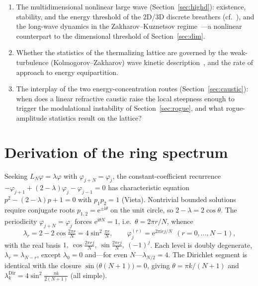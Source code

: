 \documentclass[11pt,reqno]{amsart}
\theoremstyle{plain}
\theoremstyle{definition}
\newcommand{\LN}{L_N}
\newcommand{\eu}{\mathrm{e}}
\begin{document}
\begin{enumerate}
$3.45$ in~\cite{JHR95}), so a proof can reach at most that crossover; stability along the whole breather
branch; and the \emph{fully} nonlinear regime---saturation and the rogue-wave focusing---where the admissible
coupling shrinks with the Diophantine alignment time.
\item The multidimensional nonlinear large wave (Section~\ref{sec:highd}): existence, stability, and
the energy threshold of the $2$D/$3$D discrete breathers (cf.~\cite{FKM97}), and the long-wave dynamics in the
Zakharov--Kuznetsov regime~\cite{ZakharovKuznetsov}---a nonlinear counterpart to the dimensional
threshold of Section~\ref{sec:dim}.
\item Whether the statistics of the thermalizing lattice are governed by the weak-turbulence
(Kolmogorov--Zakharov) wave kinetic description~\cite{ZakharovLvovFalkovich,DengHani}, and the rate of
approach to energy equipartition.
\item The interplay of the two energy-concentration routes (Section~\ref{sec:caustic}): when does a
linear refractive caustic raise the local steepness enough to trigger the modulational instability of
Section~\ref{sec:rogue}, and what rogue-amplitude statistics result on the lattice?
\end{enumerate}

\appendix

\section{Derivation of the ring spectrum}\label{app:spectrum}
Seeking $\LN\varphi=\lambda\varphi$ with $\varphi_{j+N}=\varphi_j$, the constant-coefficient recurrence
$-\varphi_{j+1}+(2-\lambda)\varphi_j-\varphi_{j-1}=0$ has characteristic equation
$p^2-(2-\lambda)p+1=0$ with $p_1p_2=1$ (Vieta). Nontrivial bounded solutions require conjugate roots
$p_{1,2}=\eu^{\pm\mathrm i\theta}$ on the unit circle, so $2-\lambda=2\cos\theta$. The periodicity
$\varphi_{j+N}=\varphi_j$ forces $\eu^{\mathrm i\theta N}=1$, i.e.\ $\theta=2\pi r/N$, whence
\[
  \lambda_r=2-2\cos\tfrac{2\pi r}{N}=4\sin^2\tfrac{\pi r}{N},\qquad
  \varphi^{(r)}_j=\eu^{2\pi\mathrm i rj/N}\ \ (r=0,\dots,N-1),
\]
with the real basis $1,\ \cos\frac{2\pi rj}{N},\ \sin\frac{2\pi rj}{N},\ (-1)^j$. Each level is doubly
degenerate, $\lambda_r=\lambda_{N-r}$, except $\lambda_0=0$ and---for even $N$---$\lambda_{N/2}=4$.
The Dirichlet segment is identical with the closure $\sin\bigl(\theta(N{+}1)\bigr)=0$, giving
$\theta=\pi k/(N{+}1)$ and $\lambda^{\mathrm{Dir}}_k=4\sin^2\frac{\pi k}{2(N+1)}$ (all simple).
\end{document}
